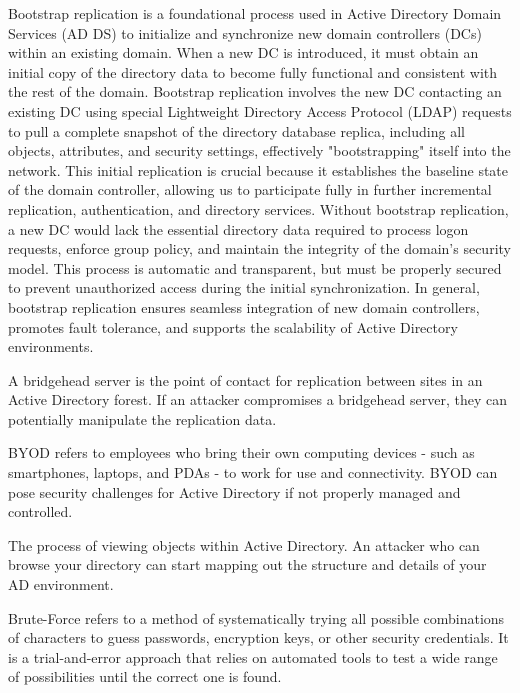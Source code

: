  Bootstrap replication is a foundational process used in Active Directory Domain Services (AD DS) to initialize and synchronize new domain controllers (DCs) within an existing domain. When a new DC is introduced, it must obtain an initial copy of the directory data to become fully functional and consistent with the rest of the domain. Bootstrap replication involves the new DC contacting an existing DC using special Lightweight Directory Access Protocol (LDAP) requests to pull a complete snapshot of the directory database replica, including all objects, attributes, and security settings, effectively "bootstrapping" itself into the network. This initial replication is crucial because it establishes the baseline state of the domain controller, allowing us to participate fully in further incremental replication, authentication, and directory services. Without bootstrap replication, a new DC would lack the essential directory data required to process logon requests, enforce group policy, and maintain the integrity of the domain's security model. This process is automatic and transparent, but must be properly secured to prevent unauthorized access during the initial synchronization. In general, bootstrap replication ensures seamless integration of new domain controllers, promotes fault tolerance, and supports the scalability of Active Directory environments.

 A bridgehead server is the point of contact for replication between sites in an Active Directory forest. If an attacker compromises a bridgehead server, they can potentially manipulate the replication data.

 BYOD refers to employees who bring their own computing devices - such as smartphones, laptops, and PDAs - to work for use and connectivity. BYOD can pose security challenges for Active Directory if not properly managed and controlled.

 The process of viewing objects within Active Directory. An attacker who can browse your directory can start mapping out the structure and details of your AD environment.

 Brute-Force refers to a method of systematically trying all possible combinations of characters to guess passwords, encryption keys, or other security credentials. It is a trial-and-error approach that relies on automated tools to test a wide range of possibilities until the correct one is found.

